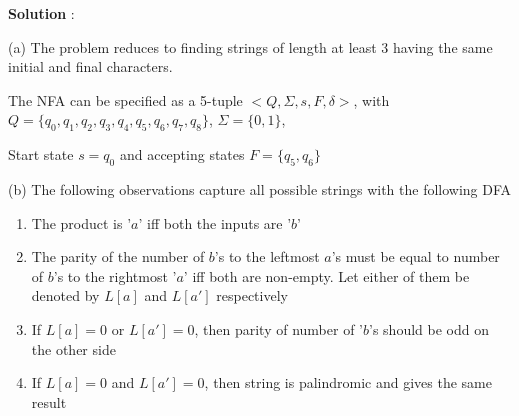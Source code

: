 \documentclass{article}
\begin{document}
    \textbf{Solution} : 

    (a) The problem reduces to finding strings of length at least 3 having the same initial and final characters. 
    
    \quad The NFA can be specified as a 5-tuple $<Q, \Sigma, s, F, \delta>$, with $Q = \{q_0,q_1,q_2,q_3,q_4,q_5,q_6,q_7,q_8\}$, $\Sigma = \{0,1\}$, 
    
    \quad Start state $s = q_0$ and accepting states $F = \{q_5 , q_6\}$

    \begin{center}
    \end{center}
    
    (b) The following observations capture all possible strings with the following DFA
    
    \begin{enumerate}
        \item The product is '$a$' iff both the inputs are '$b$'
        \item The parity of the number of $b$'s to the leftmost $a$'s must be equal to number of $b$'s to the rightmost '$a$' iff both are non-empty. Let either of them be denoted by $L[a]$ and $L[a']$ respectively
        \item If  $L[a] = 0$  or $L[a'] = 0$, then parity of number of '$b$'s should be odd on the other side
        \item If $L[a] = 0$ and $L[a'] = 0$, then string is palindromic and gives the same result
    \end{enumerate}
    
\end{document}
